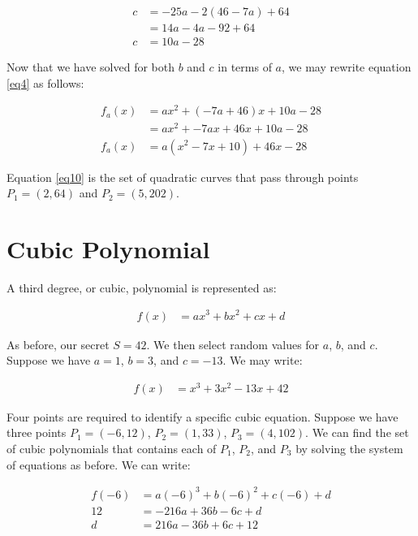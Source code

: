 \documentclass[preview,border=3mm]{article}
\begin{document}
\begin{align}
    c &= -25a -2(46 - 7a) + 64 \nonumber \\
      &= 14a - 4a - 92 +64 \nonumber \\
    c &= 10a - 28 \label{eq9}
\end{align}

\noindent
Now that we have solved for both $b$ and $c$ in terms of $a$, we may rewrite
equation \ref{eq4} as follows:

\begin{align}
    f_a(x) &= ax^2 + (-7a + 46)x + 10a - 28 \nonumber \\
           &= ax^2 + -7ax + 46x + 10a - 28 \nonumber \\
    f_a(x) &= a(x^2 - 7x + 10) + 46x -28 \label{eq10}
\end{align}

\noindent
Equation \ref{eq10} is the set of quadratic curves that pass through points
$P_1 = (2, 64)$ and $P_2 = (5, 202)$.


\section{Cubic Polynomial}

\noindent
A third degree, or cubic, polynomial is represented as:

\begin{align}
    f(x) &= ax^3 + bx^2 + cx + d \label{eq11}
\end{align}

\noindent
As before, our secret $S = 42$. We then select random values for $a$, $b$, and
$c$. Suppose we have $a = 1$, $b = 3$, and $c = -13$. We may write:

\begin{align}
    f(x) &= x^3 + 3x^2 - 13x + 42 \label{eq12}
\end{align}

\noindent
Four points are required to identify a specific cubic equation. Suppose we have
three points $P_1 = (-6, 12)$, $P_2 = (1, 33)$, $P_3 = (4, 102)$. We can find
the set of cubic polynomials that contains each of $P_1$, $P_2$, and $P_3$ by
solving the system of equations as before. We can write:

\begin{align}
    f(-6) &= a(-6)^3 + b(-6)^2 + c(-6) + d \nonumber \\
    12    &= -216a + 36b - 6c + d \nonumber \\
    d     &= 216a - 36b + 6c + 12 \label{eq13}
\end{align}
\end{document}
